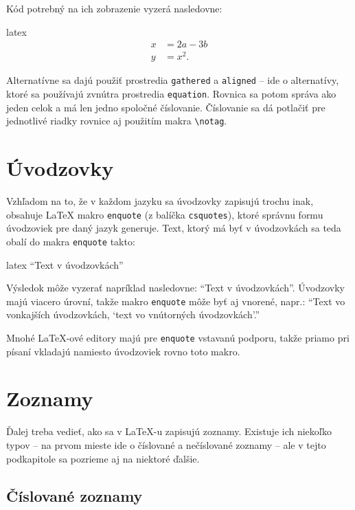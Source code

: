 Kód potrebný na ich zobrazenie vyzerá nasledovne:
\begin{inlinecode}[breaklines=True]{latex}
\begin{align}
x &= 2a - 3b \\
y &= x^2.
\end{align}
\end{inlinecode}

Alternatívne sa dajú použiť prostredia \texttt{gathered} a \texttt{aligned} -- ide o alternatívy, ktoré sa používajú zvnútra prostredia \texttt{equation}. Rovnica sa potom správa ako jeden celok a má len jedno spoločné číslovanie. Číslovanie sa dá potlačiť pre jednotlivé riadky rovnice aj použitím makra \texttt{{\textbackslash}notag}.

\section{Úvodzovky}

Vzhľadom na to, že v každom jazyku sa úvodzovky zapisujú trochu inak, obsahuje LaTeX makro \texttt{enquote} (z balíčka \texttt{csquotes}), ktoré správnu formu úvodzoviek pre daný jazyk generuje. Text, ktorý má byť v úvodzovkách sa teda obalí do makra \texttt{enquote} takto:
\begin{inlinecode}[breaklines=True]{latex}
\enquote{Text v úvodzovkách}
\end{inlinecode}

Výsledok môže vyzerať napríklad nasledovne: \enquote{Text v úvodzovkách}. Úvodzovky majú viacero úrovní, takže makro \texttt{enquote} môže byť aj vnorené, napr.: \enquote{Text vo vonkajších úvodzovkách, \enquote{text vo vnútorných úvodzovkách}.}

Mnohé LaTeX-ové editory majú pre \texttt{enquote} vstavanú podporu, takže priamo pri písaní vkladajú namiesto úvodzoviek rovno toto makro.

\section{Zoznamy}

Ďalej treba vedieť, ako sa v LaTeX-u zapisujú zoznamy. Existuje ich niekoľko typov -- na prvom mieste ide o číslované a nečíslované zoznamy -- ale v tejto podkapitole sa pozrieme aj na niektoré ďalšie.

\subsection{Číslované zoznamy}

